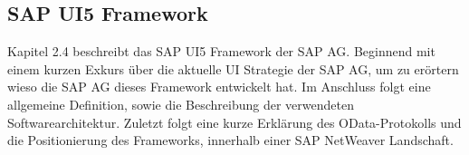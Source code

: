 %
%    


\subsection{SAP UI5 Framework}
Kapitel 2.4 beschreibt das SAP UI5 Framework der SAP AG. Beginnend mit einem kurzen Exkurs über die aktuelle UI Strategie der SAP AG, um zu erörtern wieso die SAP AG dieses Framework entwickelt hat. Im Anschluss folgt eine allgemeine Definition, sowie die Beschreibung der verwendeten Softwarearchitektur. Zuletzt folgt eine kurze Erklärung des OData-Protokolls und die Positionierung des Frameworks, innerhalb einer SAP NetWeaver Landschaft.

